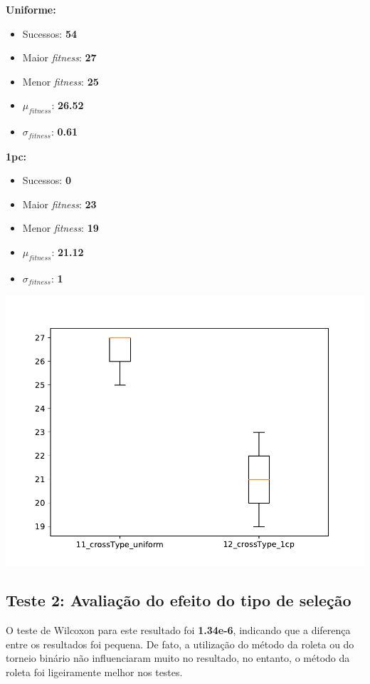 \documentclass[11pt,a4paper]{article}
\begin{document}
\begin{minipage}{0.25\linewidth}
\textbf{Uniforme:}
\begin{itemize}
	\footnotesize
	\setlength\itemsep{0em}
	\item Sucessos: \textbf{54}
	\item Maior \textit{fitness}: \textbf{27}
	\item Menor \textit{fitness}: \textbf{25}
	\item $\mu_{\textit{fitness}}$: \textbf{26.52}
	\item $\sigma_{\textit{fitness}}$: \textbf{0.61}
\end{itemize}
\end{minipage}
\begin{minipage}{0.25\linewidth}
\textbf{1pc:}
\begin{itemize}
	\footnotesize
	\setlength\itemsep{0em}
	\item Sucessos: \textbf{0}
	\item Maior \textit{fitness}: \textbf{23}
	\item Menor \textit{fitness}: \textbf{19}
	\item $\mu_{\textit{fitness}}$: \textbf{21.12}
	\item $\sigma_{\textit{fitness}}$: \textbf{1}
\end{itemize}
\end{minipage}
\begin{minipage}{0.5\linewidth}
\includegraphics[scale=0.48]{teste1.pdf} 
\end{minipage}


\subsection{Teste 2: Avaliação do efeito do tipo de seleção}
O teste de Wilcoxon para este resultado foi \textbf{1.34e-6}, indicando que a diferença entre os resultados foi pequena. De fato, a utilização do método da roleta ou do torneio binário não influenciaram muito no resultado, no entanto, o método da roleta foi ligeiramente melhor nos testes.\\
\end{document}
